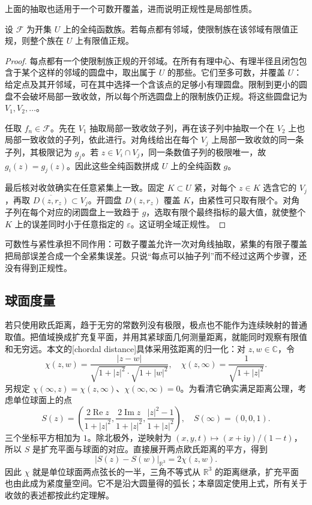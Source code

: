 上面的抽取也适用于一个可数开覆盖，进而说明正规性是局部性质。
\begin{proposition}\label{b3:prop:04-normal-locality}
设 \(\mathcal F\) 为开集 \(U\) 上的全纯函数族。若每点都有邻域，使限制族在该邻域有限值正规，则整个族在 \(U\) 上有限值正规。
\end{proposition}
\begin{proof}
每点都有一个使限制族正规的开邻域。在所有有理中心、有理半径且闭包包含于某个这样的邻域的圆盘中，取出属于 \(U\) 的那些。它们至多可数，并覆盖 \(U\)：给定点及其开邻域，可在其中选择一个含该点的足够小有理圆盘。限制到更小的圆盘不会破坏局部一致收敛，所以每个所选圆盘上的限制族仍正规。将这些圆盘记为 \(V_1,V_2,\ldots\)。

任取 \(f_n\in\mathcal F\)。先在 \(V_1\) 抽取局部一致收敛子列，再在该子列中抽取一个在 \(V_2\) 上也局部一致收敛的子列，依此进行。对角线给出在每个 \(V_j\) 上局部一致收敛的同一条子列，其极限记为 \(g_j\)。若 \(z\in V_i\cap V_j\)，同一条数值子列的极限唯一，故 \(g_i(z)=g_j(z)\)。因此这些全纯函数拼成 \(U\) 上的全纯函数 \(g\)。

最后核对收敛确实在任意紧集上一致。固定 \(K\subset U\) 紧，对每个 \(z\in K\) 选含它的 \(V_j\)，再取 \(\overline{D(z,r_z)}\subset V_j\)。开圆盘 \(D(z,r_z)\) 覆盖 \(K\)，由紧性可只取有限个。对角子列在每个对应的闭圆盘上一致趋于 \(g\)，选取有限个最终指标的最大值，就使整个 \(K\) 上的误差同时小于任意指定的 \(\varepsilon\)。这证明全域正规性。
\end{proof}
可数性与紧性承担不同作用：可数子覆盖允许一次对角线抽取，紧集的有限子覆盖把局部误差合成一个全紧集误差。只说“每点可以抽子列”而不经过这两个步骤，还没有得到正规性。

\subsection{球面度量}
\label{b3:subsec:040203}

若只使用欧氏距离，趋于无穷的常数列没有极限，极点也不能作为连续映射的普通取值。把值域换成扩充复平面，并用其紧球面几何测量距离，就能同时观察有限值和无穷远。本文的[chordal distance]具体采用弦距离的归一化：对 \(z,w\in\mathbb C\)，令
\[
 \chi(z,w)=\frac{|z-w|}{\sqrt{1+|z|^2}\cdot\sqrt{1+|w|^2}},\quad
 \chi(z,\infty)=\frac1{\sqrt{1+|z|^2}}.
\]
另规定 \(\chi(\infty,z)=\chi(z,\infty)\)、\(\chi(\infty,\infty)=0\)。为看清它确实满足距离公理，考虑单位球面上的点
\[
 S(z)=\left(\frac{2\operatorname{Re}z}{1+|z|^2},
             \frac{2\operatorname{Im}z}{1+|z|^2},
             \frac{|z|^2-1}{1+|z|^2}\right),
 \quad S(\infty)=(0,0,1).
\]
三个坐标平方相加为 \(1\)。除北极外，逆映射为
\((x,y,t)\mapsto(x+\mathrm{i}y)/(1-t)\)，所以 \(S\) 是扩充平面与球面的对应。直接展开两点欧氏距离的平方，得到
\[
 |S(z)-S(w)|_{\mathbb R^3}=2\chi(z,w).
\]
因此 \(\chi\) 就是单位球面两点弦长的一半，三角不等式从 \(\mathbb R^3\) 的距离继承，扩充平面也由此成为紧度量空间。它不是沿大圆量得的弧长；本章固定使用上式，所有关于收敛的表述都按此约定理解。


